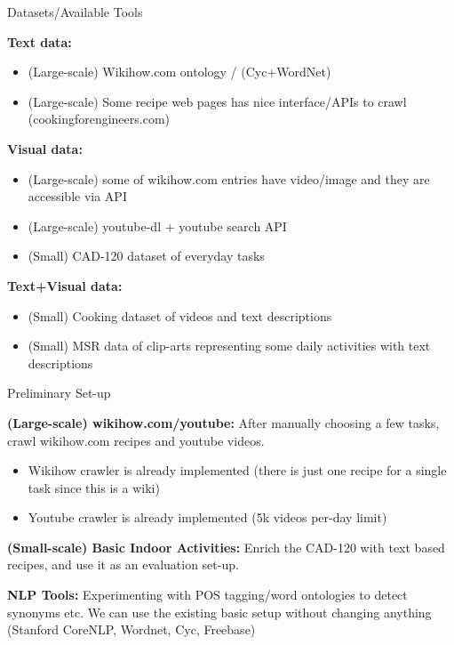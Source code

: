 \begin{frame}{Datasets/Available Tools}

{\bf Text data:}
\begin{itemize}
\item (Large-scale) Wikihow.com ontology / (Cyc+WordNet)
\item (Large-scale) Some recipe web pages has nice interface/APIs to crawl (cookingforengineers.com)
\end{itemize}

{\bf Visual data:}
\begin{itemize}
\item (Large-scale) some of wikihow.com entries have video/image and they are accessible via API
\item (Large-scale) youtube-dl + youtube search API
\item (Small) CAD-120 dataset of everyday tasks
\end{itemize}

{\bf Text+Visual data:}
\begin{itemize}
\item (Small) Cooking dataset of videos and text descriptions
\item (Small) MSR data of clip-arts representing some daily activities with text descriptions
\end{itemize}

\end{frame}


\begin{frame}{Preliminary Set-up}

{\bf (Large-scale) wikihow.com/youtube:} After manually choosing a few tasks, crawl wikihow.com recipes and youtube videos.
\begin{itemize}
\item Wikihow crawler is already implemented (there is just one recipe for a single task since this is a wiki)
\item Youtube crawler is already implemented (5k videos per-day limit)
\end{itemize}

{\bf (Small-scale) Basic Indoor Activities:} Enrich the CAD-120 with text based recipes, and use it as an evaluation set-up.

{\bf NLP Tools:} Experimenting with POS tagging/word ontologies to detect synonyms etc. We can use the existing basic setup without changing anything (Stanford CoreNLP, Wordnet, Cyc, Freebase)
\end{frame}



